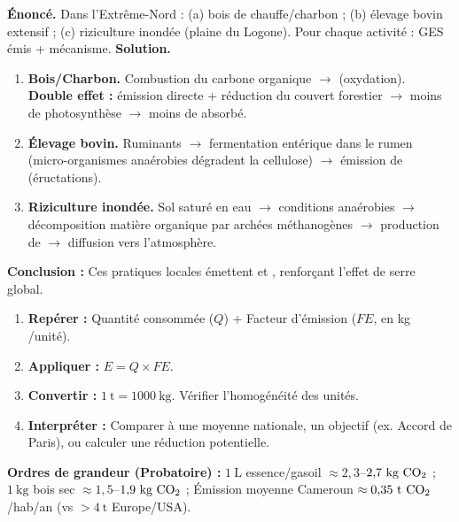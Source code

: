 \documentclass[11pt]{article}
\begin{document}
\begin{exoresolu}
\textbf{Énoncé.} Dans l'Extrême-Nord : (a) bois de chauffe/charbon ; (b) élevage bovin extensif ; (c) riziculture inondée (plaine du Logone). Pour chaque activité : GES émis + mécanisme.
\tcblower
\textbf{Solution.}
\begin{enumerate}
\item[(a)] \textbf{Bois/Charbon.} Combustion du carbone organique $\rightarrow$  (oxydation). \textbf{Double effet :} émission directe + réduction du couvert forestier $\rightarrow$ moins de photosynthèse $\rightarrow$ moins de  absorbé.
\item[(b)] \textbf{Élevage bovin.} Ruminants $\rightarrow$ fermentation entérique dans le rumen (micro-organismes anaérobies dégradent la cellulose) $\rightarrow$ émission de  (éructations).
\item[(c)] \textbf{Riziculture inondée.} Sol saturé en eau $\rightarrow$ conditions anaérobies $\rightarrow$ décomposition matière organique par archées méthanogènes $\rightarrow$ production de  $\rightarrow$ diffusion vers l'atmosphère.
\end{enumerate}
\textbf{Conclusion :} Ces pratiques locales émettent  et , renforçant l'effet de serre global.
\end{exoresolu}

\begin{methode}
\begin{enumerate}
\item \textbf{Repérer :} Quantité consommée ($Q$) + Facteur d'émission ($FE$, en kg /unité).
\item \textbf{Appliquer :} $E = Q \times FE$.
\item \textbf{Convertir :} $1\ \text{t} = 1000\ \text{kg}$. Vérifier l'homogénéité des unités.
\item \textbf{Interpréter :} Comparer à une moyenne nationale, un objectif (ex. Accord de Paris), ou calculer une réduction potentielle.
\end{enumerate}
\textbf{Ordres de grandeur (Probatoire) :} $1\ \text{L}$ essence/gasoil $\approx 2{,}3$--$2{,}7\ \text{kg}\ \ce{CO2}$ ; $1\ \text{kg}$ bois sec $\approx 1{,}5$--$1{,}9\ \text{kg}\ \ce{CO2}$ ; Émission moyenne Cameroun $\approx 0{,}35\ \text{t}\ \ce{CO2}$/hab/an (vs $>4\ \text{t}$ Europe/USA).
\end{methode}
\end{document}

